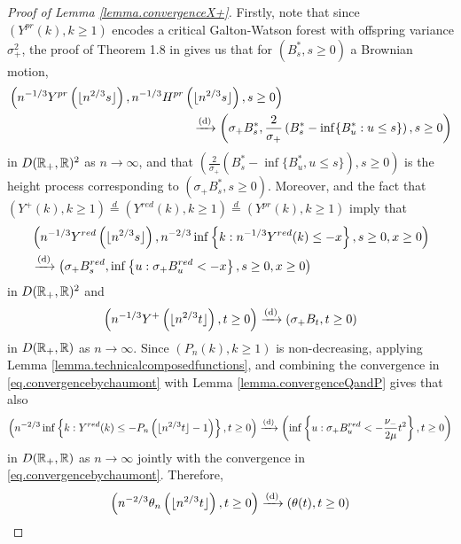 \begin{proof}[Proof of Lemma \ref{lemma.convergenceX+}]
Firstly, note that since $(Y^{pr}(k),k\geq 1)$ encodes a critical Galton-Watson forest with offspring variance $\sigma_+^2$, the proof of Theorem 1.8 in \citet{legallRandomTreesApplications2005} gives us that for $(B^*_s,s\geq 0)$ a Brownian motion,
\begin{align}\label{eq.convergenceX}
&\left(n^{-1/3}Y^{pr}\left(\lfloor n^{2/3}s\rfloor \right), n^{-1/3}H^{pr}\left(\lfloor n^{2/3}s\rfloor \right), s\geq 0 \right) \nonumber \\
& \hspace{15em} \todist \left(\sigma_+ B^*_s,\frac{2}{\sigma_+} \left(B^*_s-\inf\{B^*_u:u\leq s\}\right),  s\geq 0\right)
\end{align} 
 in $D({\mathbb R}_+,{\mathbb R})^2$ as $n\to \infty$, and that $\left(\frac{2}{\sigma_+}(B^*_s-\inf\{B^*_u,u\leq s\}),s\geq 0\right)$ is the height process corresponding to $\left(\sigma_+ B^*_s,s \geq 0\right)$. Moreover, \cite{chaumontInvariancePrinciplesLocal2010} and the fact that $(Y^+(k),k\geq 1)\overset{d}{=}(Y^{red}(k),k\geq 1)\overset{d}{=}(Y^{pr}(k),k\geq 1)$ imply that
\begin{align}\begin{split}\label{eq.convergencebychaumont}&\left(n^{-1/3}Y^{red}\left(\lfloor n^{2/3} s \rfloor \right), n^{-2/3}\inf\left\{k:n^{-1/3}Y^{red}(k) \leq -x\right\}, s \geq 0, x\geq 0 \right)\\
&\xrightarrow[]{\mathrm{(d)}}\left( \sigma_+ B^{red}_s, \inf\left\{u:\sigma_+ B^{red}_u < -x\right\}, s\geq 0, x \geq 0\right)\end{split}\end{align}
in $D({\mathbb R}_+,{\mathbb R})^2$ and 
$$\left(n^{-1/3}Y^+\left(\lfloor n^{2/3} t\rfloor \right),t\geq 0\right)\xrightarrow[]{\mathrm{(d)}}\left(\sigma_+ B_t, t\geq 0\right)$$
in $D({\mathbb R}_+,{\mathbb R})$ as $n\to \infty$. 
Since $(P_n(k),k\geq 1)$ is non-decreasing, applying Lemma \ref{lemma.technicalcomposedfunctions}, and combining the convergence in \eqref{eq.convergencebychaumont} with Lemma \ref{lemma.convergenceQandP} gives that also
$$\left(n^{-2/3}\inf\left\{k:Y^{red}(k) \leq - P_n\left(\lfloor n^{2/3} t \rfloor -1\right)\right\},t\geq 0\right)\xrightarrow[]{\mathrm{(d)}}\left(\inf\left\{u:\sigma_+ B^{red}_u< -\frac{\nu_-}{2\mu} t^2\right\},t\geq 0\right)$$
  in $D({\mathbb R}_+,{\mathbb R})$ as $n\to \infty$ jointly with the convergence in \eqref{eq.convergencebychaumont}. Therefore, 
 \begin{equation}\label{eq.convergencetheta}\left(n^{-2/3}\theta_n\left(\lfloor n^{2/3}t\rfloor \right),t\geq 0 \right) \xrightarrow[]{\mathrm{(d)}} \left(\theta(t),t\geq 0\right)\end{equation}

\end{proof}
